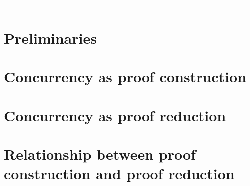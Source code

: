 \documentclass[
  tufte-book,
  notoc,
  biblatex={
    citestyle=authoryear-comp,
    autocite=footnote,
    maxcitenames=2,
    bibstyle=authoryear,
    dashed=false,
    mergedate=basic,
    maxbibnames=99,
    backref=true,
    doi=false,
    isbn=false,
  }
]{tufte-thesis}
\begin{document}
\oddsidemargin=\saveoddsidemargin
\evensidemargin=\saveevensidemargin

\tableofcontents

\mainmatter




\part{Preliminaries}\label{part:preliminaries}




 \part{Concurrency as proof construction}\label{part:proof-construction}



% 

% 


\part{Concurrency as proof reduction}\label{part:proof-reduction}




\part{Relationship between proof construction and proof reduction}\label{part:comparison}




\appendix



\backmatter

\printbibliography
\end{document}
